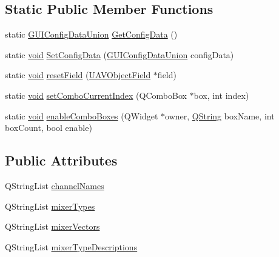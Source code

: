 \subsection*{\-Static \-Public \-Member \-Functions}
\begin{DoxyCompactItemize}
\item 
static \hyperlink{union_g_u_i_config_data_union}{\-G\-U\-I\-Config\-Data\-Union} \hyperlink{group___config_plugin_gae2c0e1bb819f6b9c95402cea8702e177}{\-Get\-Config\-Data} ()
\item 
static \hyperlink{group___u_a_v_objects_plugin_ga444cf2ff3f0ecbe028adce838d373f5c}{void} \hyperlink{group___config_plugin_ga0a6981811a5b0f3c144bde081c414da0}{\-Set\-Config\-Data} (\hyperlink{union_g_u_i_config_data_union}{\-G\-U\-I\-Config\-Data\-Union} config\-Data)
\item 
static \hyperlink{group___u_a_v_objects_plugin_ga444cf2ff3f0ecbe028adce838d373f5c}{void} \hyperlink{group___config_plugin_ga5d58a26e503e6a3d9a565932148036ce}{reset\-Field} (\hyperlink{class_u_a_v_object_field}{\-U\-A\-V\-Object\-Field} $\ast$field)
\item 
static \hyperlink{group___u_a_v_objects_plugin_ga444cf2ff3f0ecbe028adce838d373f5c}{void} \hyperlink{group___config_plugin_ga56c01e65c75f32c462e8a5191fabffce}{set\-Combo\-Current\-Index} (\-Q\-Combo\-Box $\ast$box, int index)
\item 
static \hyperlink{group___u_a_v_objects_plugin_ga444cf2ff3f0ecbe028adce838d373f5c}{void} \hyperlink{group___config_plugin_ga80929dea8a5f354f9d7df8162e027b29}{enable\-Combo\-Boxes} (\-Q\-Widget $\ast$owner, \hyperlink{group___u_a_v_objects_plugin_gab9d252f49c333c94a72f97ce3105a32d}{\-Q\-String} box\-Name, int box\-Count, bool enable)
\end{DoxyCompactItemize}
\subsection*{\-Public \-Attributes}
\begin{DoxyCompactItemize}
\item 
\-Q\-String\-List \hyperlink{group___config_plugin_gaca881ae0a25d7e063b68a36b2f5576bf}{channel\-Names}
\item 
\-Q\-String\-List \hyperlink{group___config_plugin_ga494123875db35fe04e5a0512850e8c02}{mixer\-Types}
\item 
\-Q\-String\-List \hyperlink{group___config_plugin_ga0f47a1cc91e5a63c70f0802f3533e193}{mixer\-Vectors}
\item 
\-Q\-String\-List \hyperlink{group___config_plugin_ga05f4cbfd3c5b0fcc642f17003888459a}{mixer\-Type\-Descriptions}
\end{DoxyCompactItemize}
